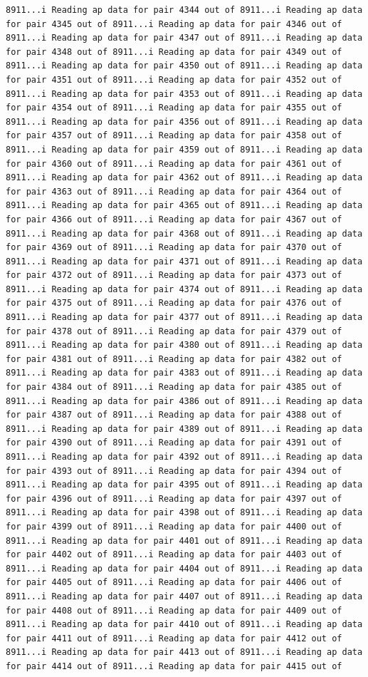 \documentclass[
]{article}
\begin{document}
\begin{verbatim}
8911...i Reading ap data for pair 4344 out of 8911...i Reading ap data for pair 4345 out of 8911...i Reading ap data for pair 4346 out of 8911...i Reading ap data for pair 4347 out of 8911...i Reading ap data for pair 4348 out of 8911...i Reading ap data for pair 4349 out of 8911...i Reading ap data for pair 4350 out of 8911...i Reading ap data for pair 4351 out of 8911...i Reading ap data for pair 4352 out of 8911...i Reading ap data for pair 4353 out of 8911...i Reading ap data for pair 4354 out of 8911...i Reading ap data for pair 4355 out of 8911...i Reading ap data for pair 4356 out of 8911...i Reading ap data for pair 4357 out of 8911...i Reading ap data for pair 4358 out of 8911...i Reading ap data for pair 4359 out of 8911...i Reading ap data for pair 4360 out of 8911...i Reading ap data for pair 4361 out of 8911...i Reading ap data for pair 4362 out of 8911...i Reading ap data for pair 4363 out of 8911...i Reading ap data for pair 4364 out of 8911...i Reading ap data for pair 4365 out of 8911...i Reading ap data for pair 4366 out of 8911...i Reading ap data for pair 4367 out of 8911...i Reading ap data for pair 4368 out of 8911...i Reading ap data for pair 4369 out of 8911...i Reading ap data for pair 4370 out of 8911...i Reading ap data for pair 4371 out of 8911...i Reading ap data for pair 4372 out of 8911...i Reading ap data for pair 4373 out of 8911...i Reading ap data for pair 4374 out of 8911...i Reading ap data for pair 4375 out of 8911...i Reading ap data for pair 4376 out of 8911...i Reading ap data for pair 4377 out of 8911...i Reading ap data for pair 4378 out of 8911...i Reading ap data for pair 4379 out of 8911...i Reading ap data for pair 4380 out of 8911...i Reading ap data for pair 4381 out of 8911...i Reading ap data for pair 4382 out of 8911...i Reading ap data for pair 4383 out of 8911...i Reading ap data for pair 4384 out of 8911...i Reading ap data for pair 4385 out of 8911...i Reading ap data for pair 4386 out of 8911...i Reading ap data for pair 4387 out of 8911...i Reading ap data for pair 4388 out of 8911...i Reading ap data for pair 4389 out of 8911...i Reading ap data for pair 4390 out of 8911...i Reading ap data for pair 4391 out of 8911...i Reading ap data for pair 4392 out of 8911...i Reading ap data for pair 4393 out of 8911...i Reading ap data for pair 4394 out of 8911...i Reading ap data for pair 4395 out of 8911...i Reading ap data for pair 4396 out of 8911...i Reading ap data for pair 4397 out of 8911...i Reading ap data for pair 4398 out of 8911...i Reading ap data for pair 4399 out of 8911...i Reading ap data for pair 4400 out of 8911...i Reading ap data for pair 4401 out of 8911...i Reading ap data for pair 4402 out of 8911...i Reading ap data for pair 4403 out of 8911...i Reading ap data for pair 4404 out of 8911...i Reading ap data for pair 4405 out of 8911...i Reading ap data for pair 4406 out of 8911...i Reading ap data for pair 4407 out of 8911...i Reading ap data for pair 4408 out of 8911...i Reading ap data for pair 4409 out of 8911...i Reading ap data for pair 4410 out of 8911...i Reading ap data for pair 4411 out of 8911...i Reading ap data for pair 4412 out of 8911...i Reading ap data for pair 4413 out of 8911...i Reading ap data for pair 4414 out of 8911...i Reading ap data for pair 4415 out of 
\end{verbatim}
\end{document}
